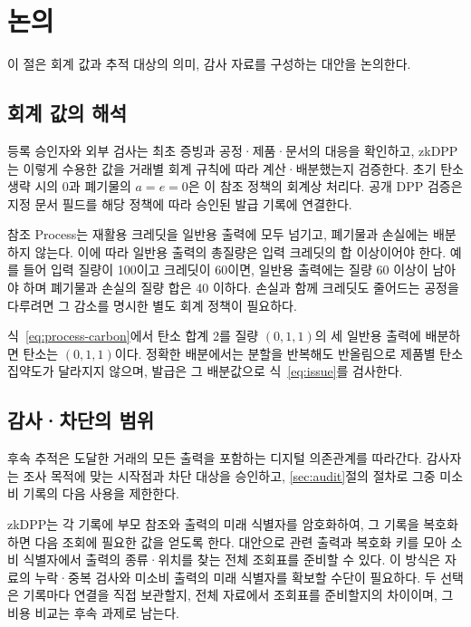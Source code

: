 \section{논의}
\label{sec:limits}

이 절은 회계 값과 추적 대상의 의미, 감사 자료를 구성하는 대안을 논의한다.

\subsection{회계 값의 해석}

등록 승인자와 외부 검사는 최초 증빙과 공정·제품·문서의 대응을
확인하고, zkDPP는 이렇게 수용한 값을 거래별 회계 규칙에 따라
계산·배분했는지 검증한다. 초기 탄소 생략 시의 0과 폐기물의
$a=e=0$은 이 참조 정책의 회계상 처리다.
공개 DPP 검증은 지정 문서 필드를 해당 정책에 따라 승인된 발급 기록에 연결한다.

참조 Process는 재활용 크레딧을 일반용 출력에 모두 넘기고,
폐기물과 손실에는 배분하지 않는다. 이에 따라 일반용 출력의 총질량은
입력 크레딧의 합 이상이어야 한다. 예를 들어 입력 질량이 100이고
크레딧이 60이면, 일반용 출력에는 질량 60 이상이 남아야 하며
폐기물과 손실의 질량 합은 40 이하다.
손실과 함께 크레딧도 줄어드는 공정을 다루려면
그 감소를 명시한 별도 회계 정책이 필요하다.

식~\eqref{eq:process-carbon}에서 탄소 합계 2를
질량 $(0,1,1)$의 세 일반용 출력에 배분하면 탄소는 $(0,1,1)$이다.
정확한 배분에서는 분할을 반복해도 반올림으로 제품별 탄소 집약도가
달라지지 않으며, 발급은 그 배분값으로 식~\eqref{eq:issue}를 검사한다.

\subsection{감사·차단의 범위}

후속 추적은 도달한 거래의 모든 출력을 포함하는 디지털 의존관계를
따라간다. 감사자는 조사 목적에 맞는 시작점과 차단 대상을 승인하고,
\ref{sec:audit}절의 절차로 그중 미소비 기록의 다음 사용을 제한한다.

zkDPP는 각 기록에 부모 참조와 출력의 미래 식별자를 암호화하여,
그 기록을 복호화하면 다음 조회에 필요한 값을 얻도록 한다.
대안으로 관련 출력과 복호화 키를 모아 소비 식별자에서 출력의
종류·위치를 찾는 전체 조회표를 준비할 수 있다. 이 방식은 자료의
누락·중복 검사와 미소비 출력의 미래 식별자를 확보할 수단이 필요하다.
두 선택은 기록마다 연결을 직접 보관할지, 전체 자료에서 조회표를
준비할지의 차이이며, 그 비용 비교는 후속 과제로 남는다.
